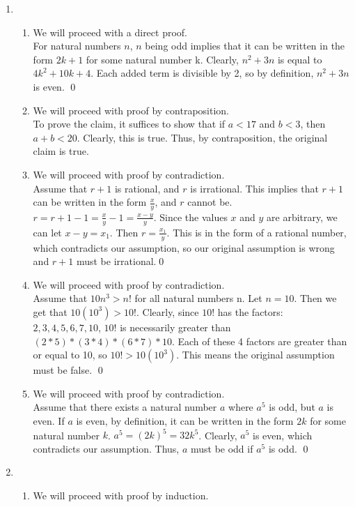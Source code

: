 \documentclass[a4paper]{article}
\newcommand{\<}{\langle}
\renewcommand{\>}{\rangle}
\renewcommand{\^}{\wedge}
\begin{document}
\begin{enumerate}
    \item
        \begin{enumerate}
            \item We will proceed with a direct proof.\\
            For natural numbers $n$, $n$ being odd implies that it can be written in the form $2k + 1$ for some natural number k. Clearly, $n^2 + 3n$ is equal to $4k^2 + 10k + 4$. Each added term is divisible by 2, so by definition, $n^2 + 3n$ is even. \qed
            \item We will proceed with proof by contraposition.\\
            To prove the claim, it suffices to show that if $a < 17$ and $b < 3$, then $a + b < 20$. Clearly, this is true. Thus, by contraposition, the original claim is true.
            \item We will proceed with proof by contradiction.\\
            Assume that $r + 1$ is rational, and $r$ is irrational. This implies that $r + 1$ can be written in the form $\frac{x}{y}$, and $r$ cannot be. $r = r + 1 - 1 = \frac{x}{y} - 1 = \frac{x-y}{y}$. Since the values $x$ and $y$ are arbitrary, we can let $x-y = x_1$. Then $r = \frac{x_1}{y}$. This is in the form of a rational number, which contradicts our assumption, so our original assumption is wrong and $r+1$ must be irrational.\qed
            \item We will proceed with proof by contradiction.\\
            Assume that $10n^3 > n!$ for all natural numbers n. Let $n = 10$. Then we get that $10(10^3) > 10!$. Clearly, since $10!$ has the factors: $2, 3, 4, 5, 6, 7, 10$, $10!$ is necessarily greater than $(2*5) * (3*4) * (6*7) * 10$. Each of these 4 factors are greater than or equal to 10, so $10! > 10(10^3)$. This means the original assumption must be false. \qed
            \item We will proceed with proof by contradiction.\\ Assume that there exists a natural number $a$ where $a^5$ is odd, but $a$ is even. If $a$ is even, by definition, it can be written in the form $2k$ for some natural number $k$. $a^5 = (2k)^5 = 32k^5$. Clearly, $a^5$ is even, which contradicts our assumption. Thus, $a$ must be odd if $a^5$ is odd. \qed
        \end{enumerate}
    \item
        \begin{enumerate}
            \item We will proceed with proof by induction.\\

\end{enumerate}
\end{enumerate}
\end{document}
